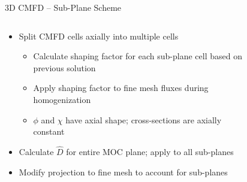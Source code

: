 \begin{frame}[t]{3D CMFD -- Sub-Plane Scheme}

\begin{columns}
  \begin{column}{0.6\textwidth}
    \begin{itemize}
      \item Split CMFD cells axially into multiple cells
      \begin{itemize}
        \item Calculate shaping factor for each sub-plane cell based on 
        previous solution
        \item Apply shaping factor to fine mesh fluxes during homogenization
        \item $\phi$ and $\chi$ have axial shape; cross-sections are axially 
        constant
      \end{itemize}
      \item Calculate $\hat{D}$ for entire MOC plane; apply to all sub-planes
      \item Modify projection to fine mesh to account for sub-planes
    \end{itemize}
  \end{column}
  \begin{column}{0.4\textwidth}
    \begin{figure}[h]
      \centering
      \resizebox{!}{0.7\textheight}{}
    \end{figure}
  \end{column}
\end{columns}

\end{frame}


